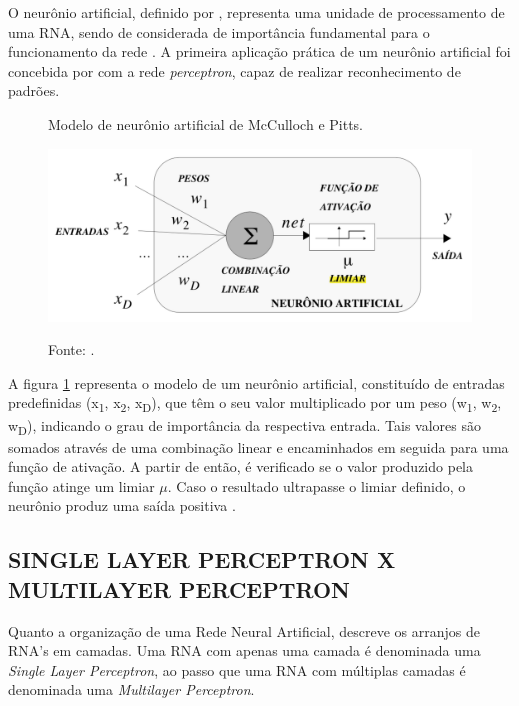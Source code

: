 O neurônio artificial, definido por , representa uma unidade de processamento de uma RNA, sendo de considerada de importância fundamental para o funcionamento da rede \cite{haykin2007redes}. A primeira aplicação prática de um neurônio artificial foi concebida por  com a rede \textit{perceptron}, capaz de realizar reconhecimento de padrões.

\begin{figure}[h]
	\caption{Modelo de neurônio artificial de McCulloch e Pitts.}
	\caption*{Fonte: .}
	\centering %
	\includegraphics[width=14cm]{resources/modelo_neuronio.png} %
	\label{figura:modelo_neuronio}	
\end{figure}

A figura \ref{figura:modelo_neuronio} representa o modelo de um neurônio artificial, constituído de entradas predefinidas (x\textsubscript{1}, x\textsubscript{2}, x\textsubscript{D}), que têm o seu valor multiplicado por um peso (w\textsubscript{1}, w\textsubscript{2}, w\textsubscript{D}), indicando o grau de importância da respectiva entrada. Tais valores são somados através de uma combinação linear e encaminhados em seguida para uma função de ativação. A partir de então, é verificado se o valor produzido pela função atinge um limiar \(\mu\). Caso o resultado ultrapasse o limiar definido, o neurônio produz uma saída positiva \cite{thomas2019}.

\subsection{SINGLE LAYER PERCEPTRON X MULTILAYER PERCEPTRON}

Quanto a organização de uma Rede Neural Artificial,  descreve os arranjos de RNA's em camadas. Uma RNA com apenas uma camada é denominada uma \textit{Single Layer Perceptron}, ao passo que uma RNA com múltiplas camadas é denominada uma \textit{Multilayer Perceptron}.

